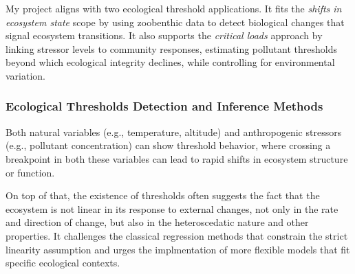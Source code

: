 My project aligns with two ecological threshold applications. 
It fits the \textit{shifts in ecosystem state} scope by using zoobenthic 
data to detect biological changes that signal ecosystem transitions. 
It also supports the \textit{critical loads} approach by 
linking stressor levels to community responses, estimating pollutant thresholds 
beyond which ecological integrity declines, while controlling for environmental
variation.

\subsubsection{Ecological Thresholds Detection and Inference Methods}

Both natural variables (e.g., temperature, altitude) and anthropogenic stressors (e.g., pollutant concentration)
can show threshold behavior, where crossing a  breakpoint in both these variables can lead 
to rapid shifts in ecosystem structure or function. 


On top of that, the existence of thresholds often suggests 
the fact that the ecosystem is not linear in its response to external changes,
not only in the rate and direction of change, but also in the heteroscedatic 
nature and other properties. It challenges the classical regression methods 
that constrain the strict linearity assumption and urges the implmentation of
more flexible models that fit specific ecological contexts.

